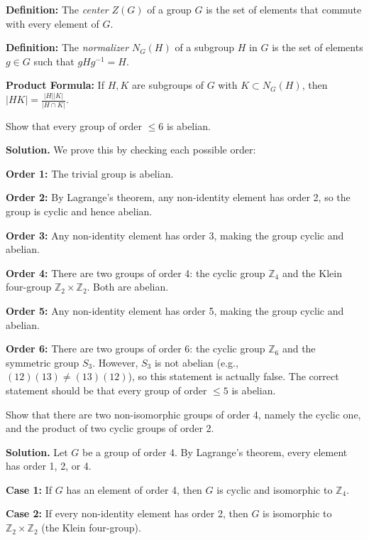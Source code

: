 \textbf{Definition:} The \textit{center} $Z(G)$ of a group $G$ is the set of elements that commute with every element of $G$.

\textbf{Definition:} The \textit{normalizer} $N_G(H)$ of a subgroup $H$ in $G$ is the set of elements $g \in G$ such that $gHg^{-1} = H$.

\textbf{Product Formula:} If $H, K$ are subgroups of $G$ with $K \subset N_G(H)$, then $|HK| = \frac{|H||K|}{|H \cap K|}$.

\begin{problembox}
Show that every group of order $\leq 6$ is abelian.
\end{problembox}

\noindent\textbf{Solution.} We prove this by checking each possible order:

\textbf{Order 1:} The trivial group is abelian.

\textbf{Order 2:} By Lagrange's theorem, any non-identity element has order 2, so the group is cyclic and hence abelian.

\textbf{Order 3:} Any non-identity element has order 3, making the group cyclic and abelian.

\textbf{Order 4:} There are two groups of order 4: the cyclic group $\mathbb{Z}_4$ and the Klein four-group $\mathbb{Z}_2 \times \mathbb{Z}_2$. Both are abelian.

\textbf{Order 5:} Any non-identity element has order 5, making the group cyclic and abelian.

\textbf{Order 6:} There are two groups of order 6: the cyclic group $\mathbb{Z}_6$ and the symmetric group $S_3$. However, $S_3$ is not abelian (e.g., $(12)(13) \neq (13)(12)$), so this statement is actually false. The correct statement should be that every group of order $\leq 5$ is abelian.

\begin{problembox}
Show that there are two non-isomorphic groups of order 4, namely the cyclic one, and the product of two cyclic groups of order 2.
\end{problembox}

\noindent\textbf{Solution.} Let $G$ be a group of order 4. By Lagrange's theorem, every element has order 1, 2, or 4.

\textbf{Case 1:} If $G$ has an element of order 4, then $G$ is cyclic and isomorphic to $\mathbb{Z}_4$.

\textbf{Case 2:} If every non-identity element has order 2, then $G$ is isomorphic to $\mathbb{Z}_2 \times \mathbb{Z}_2$ (the Klein four-group).

